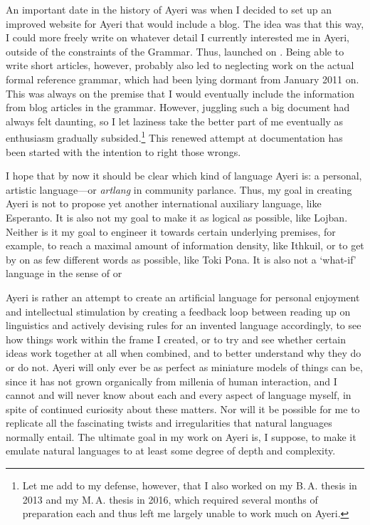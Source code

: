 An important date in the history of Ayeri was when I decided to set up an
improved website for Ayeri that would include a blog. The idea was that this
way, I could more freely write on whatever detail I currently interested me in
Ayeri, outside of the constraints of the Grammar. Thus,  launched on . Being able to write short
articles, however, probably also led to neglecting work on the actual formal
reference grammar, which had been lying dormant from January 2011 on. This was
always on the premise that I would eventually include the information from blog
articles in the grammar. However, juggling such a big document had always felt
daunting, so I let laziness take the better part of me eventually as enthusiasm
gradually subsided.\footnote{Let me add to my defense, however, that I also
worked on my B.\,A. thesis in 2013 and my M.\,A. thesis in 2016, which required
several months of preparation each and thus left me largely unable to work much
on Ayeri.} This renewed attempt at documentation has been started with the
intention to right those wrongs.

I hope that by now it should be clear which kind of language Ayeri is: a
personal, artistic language---or \emph{artlang} in community parlance. Thus, my
goal in creating Ayeri is not to propose yet another international
auxiliary language, like Esperanto. It is also not my goal to make it as
logical as possible, like Lojban. Neither is it my goal to engineer it towards
certain underlying premises, for example, to reach a maximal amount of
information density, like Ithkuil, or to get by on as few different words as
possible, like Toki Pona. It is also not a `what-if' language in the sense of
 or 

Ayeri is rather an attempt to create an artificial language for personal
enjoyment and intellectual stimulation by creating a feedback loop between
reading up on linguistics and actively devising rules for an invented language
accordingly, to see how things work within the frame I created, or to try and
see whether certain ideas work together at all when combined, and to better
understand why they do or do not. Ayeri will only ever be as perfect as
miniature models of things can be, since it has not grown organically from
millenia of human interaction, and I cannot and will never know about each and
every aspect of language myself, in spite of continued curiosity about these
matters. Nor will it be possible for me to replicate all the fascinating twists
and irregularities that natural languages normally entail. The ultimate
goal in my work on Ayeri is, I suppose, to make it emulate natural
languages to at least some degree of depth and complexity.

